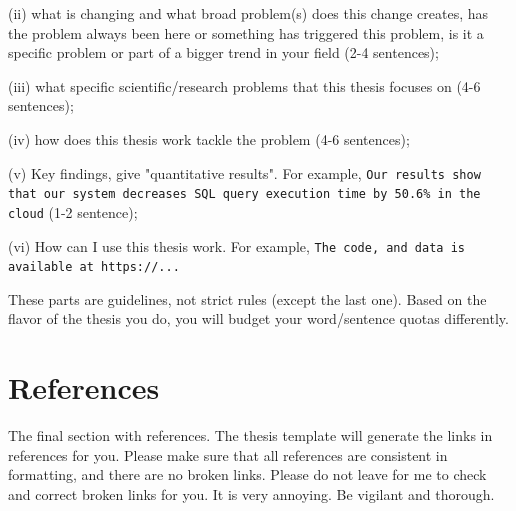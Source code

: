 \documentclass[11pt]{article}
\begin{document}
\noindent (ii) what is changing and what broad problem(s) does this change creates, has the problem always been here or something has triggered this problem, is it a specific problem or part of a bigger trend in your field (2-4 sentences); 

\noindent (iii) what specific scientific/research problems that this thesis focuses on (4-6 sentences); 

\noindent (iv) how does this thesis work tackle the problem (4-6 sentences); 

\noindent (v) Key findings, give "quantitative results". For example, \texttt{Our results show that our system decreases SQL query execution time by 50.6\% in the cloud} (1-2 sentence); 

\noindent (vi) How can I use this thesis work. For example, \texttt{The code, and data is available at https://...}  


These parts are guidelines, not strict rules (except the last one). Based on the flavor of the thesis you do, you will budget your word/sentence quotas differently. 

\newpage 

\newpage 

\newpage 

\newpage 

\newpage 
\newpage 

\newpage

\newpage 
\section{References}
The final section with references. The thesis template will generate the links in references for you. Please make sure that all references are consistent in formatting, and there are no broken links. Please do not leave for me to check and correct broken links for you. It is very annoying. Be vigilant and thorough. 

\newpage 

\end{document}
